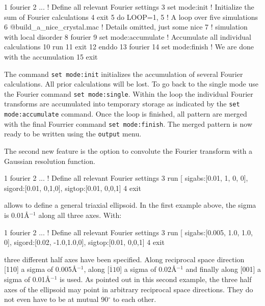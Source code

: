 \begin{MacVerbatim}
     1  fourier
     2    ...               ! Define all relevant Fourier settings
     3    set mode:init     ! Initialize the sum of Fourier calculations
     4  exit
     5  do LOOP=1, 5        ! A loop over five simulations
     6    @build_a_nice_crystal.mac   ! Details omitted, just some nice
     7                                ! simulation with local disorder
     8    fourier
     9      set mode:accumulate       ! Accumulate all individual calculations
    10      run
    11    exit
    12  enddo
    13  fourier
    14     set mode:finish            ! We are done with the accumulation
    15  exit
\end{MacVerbatim}

The command {\tt set mode:init} initializes the accumulation of several 
Fourier calculations. All prior calculations will be lost. To go back to
the single mode use the Fourier command {\tt set mode:single}. Within the 
loop the individual Fourier transforms are accumulated into temporary storage
as indicated by the {\tt set mode:accumulate} command. Once the loop is
finished, all pattern are merged with the final Fourrier command 
{\tt set mode:finish}. The merged pattern is now ready to be written 
using the {\tt output} menu.

The second new feature is the option to convolute the Fourier transform
with a Gaussian resolution function.

\begin{MacVerbatim}
     1  fourier
     2    ...               ! Define all relevant Fourier settings
     3    run  [ sigabs:[0.01, 1, 0, 0], sigord:[0.01, 0,1,0], sigtop:[0.01, 0,0,1]
     4  exit
\end{MacVerbatim}

\Discus allows to define a general triaxial ellipsoid. In the first example
above, the sigma is 0.01\AA{}$^{-1}$ along all three axes. With:

\begin{MacVerbatim}
     1  fourier
     2    ...               ! Define all relevant Fourier settings
     3    run  [ sigabs:[0.005, 1.0, 1.0, 0], sigord:[0.02, -1.0,1.0,0], sigtop:[0.01, 0,0,1]
     4  exit
\end{MacVerbatim}

three different half axes have been specified. Along reciprocal space direction [110] 
a sigma of 0.005\AA{}$^{-1}$, along [$\overline{1}10$] a sigma of 0.02\AA{}$^{-1}$
and finally along [001] a sigma of 0.01\AA{}$^{-1}$ is used. As pointed out in this
second example, the three half axes of the ellipsoid may point in arbitrary 
reciprocal space directions. They do not even have to be at mutual 90$^\circ$ to each 
other.

